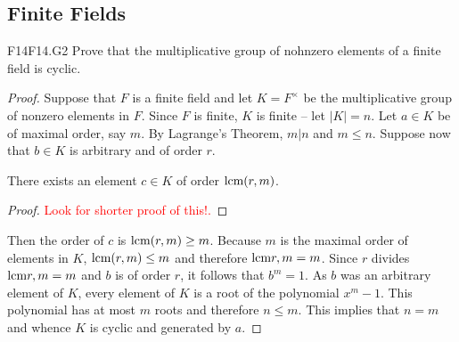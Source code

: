 \documentclass[../AlgebraQualSolutions.tex]{subfiles}
\begin{document}
\subsection{Finite Fields}

\begin{prob}{F14}{F14.G2}
	Prove that the multiplicative group of nohnzero elements of a finite field is cyclic.
\end{prob}

\begin{proof}
	Suppose that $F$ is a finite field and let $K = F^\times$ be the multiplicative group of nonzero elements in $F$. Since $F$ is finite, $K$ is finite -- let $|K| = n$. Let $a \in K$ be of maximal order, say $m$. By Lagrange's Theorem, $m | n$ and $m \leq n$. Suppose now that $b \in K$ is arbitrary and of order $r$.

	\begin{claim}
		There exists an element $c \in K$ of order $\textrm{lcm}(r,m)$.

		\begin{proof}
			\textcolor{red}{Look for shorter proof of this!.}
		\end{proof}
	\end{claim}

	Then the order of $c$ is $\textrm{lcm}(r,m) \geq m$. Because $m$ is the maximal order of elements in $K$, $\textrm{lcm}(r,m) \leq m$ and therefore $\textrm{lcm}{r,m} = m$. Since $r$ divides $\textrm{lcm}{r,m} = m$ and $b$ is of order $r$, it follows that $b^m = 1$. As $b$ was an arbitrary element of $K$, every element of $K$ is a root of the polynomial $x^m - 1$. This polynomial has at most $m$ roots and therefore $n \leq m$. This implies that $n = m$ and whence $K$ is cyclic and generated by $a$.
\end{proof}
\end{document}
